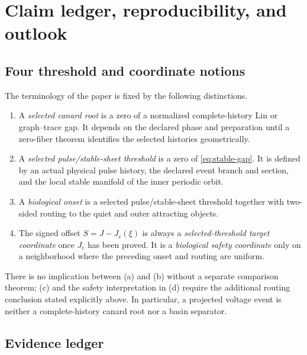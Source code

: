 \section{Claim ledger, reproducibility, and outlook}\label{sec:scope}

\subsection{Four threshold and coordinate notions}

The terminology of the paper is fixed by the following distinctions.
\begin{enumerate}[label=(\alph*)]
\item A \emph{selected canard root} is a zero of a normalized
  complete-history Lin or graph--trace gap.  It depends on the declared
  phase and preparation until a zero-fiber theorem identifies the selected
  histories geometrically.
\item A \emph{selected pulse/stable-sheet threshold} is a zero of
  \cref{eq:stable-gap}.  It is defined by an actual physical pulse history,
  the declared event branch and section, and the local stable manifold of the
  inner periodic orbit.
\item A \emph{biological onset} is a selected pulse/stable-sheet threshold
  together with two-sided routing to the quiet and outer attracting objects.
\item The signed offset \(S=J-J_c(\xi)\) is always a
  \emph{selected-threshold target coordinate} once \(J_c\) has been proved.
  It is a \emph{biological safety coordinate} only on a neighborhood where
  the preceding onset and routing are uniform.
\end{enumerate}
There is no implication between (a) and (b) without a separate comparison
theorem; (c) and the safety interpretation in (d) require the additional
routing conclusion stated explicitly above.  In particular, a projected
voltage event is neither a complete-history canard root nor a basin separator.

\subsection{Evidence ledger}

